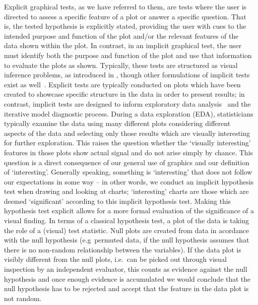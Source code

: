 \documentclass[letterpaper]{ar-1col}\usepackage[]{graphicx}\usepackage[]{color}
\begin{document}

Explicit graphical tests, as we have referred to them, are tests where the user is directed to assess a specific feature of a plot or answer a specific question.
That is, the tested hypothesis is explicitly stated, providing the user with cues to the intended purpose and function of the plot and/or the relevant features of the data shown within the plot.
In contrast, in an implicit graphical test, the user must identify both the purpose and function of the plot and use that information to evaluate the plots as shown.
Typically, these tests are structured as visual inference problems, as introduced in \citet{bujaStatisticalInferenceExploratory2009}, though other formulations of implicit tests exist as well~\citep{hasanhodzicHumansPerceiveTemporal2011}.
Explicit tests are typically conducted on plots which have been created to showcase specific structure in the data in order to present results; in contrast, implicit tests are designed to inform exploratory data analysis~\citep[as advocated by][]{tukeyTechnicalToolsStatistics1965} and the iterative model diagnostic process.
During a data exploration (EDA), statisticians typically examine the data using many different plots considering different aspects of the data and selecting only those results which are visually interesting for further exploration.
This raises the question whether the `visually interesting' features in those plots show actual signal and do not arise simply by chance. This question is a direct consequence of our general use of graphics and our definition of `interesting'. Generally speaking, something is `interesting' that does not follow our expectations in some way -- in other words, we conduct an implicit hypothesis test when drawing and looking at charts; `interesting' charts are those which are deemed `significant' according to this implicit hypothesis test. Making this hypothesis test explicit allows for a more formal evaluation of the significance of a visual finding.
In terms of a classical  hypothesis test,  a plot of the data is taking the role of a (visual) test statistic. Null plots are created from data in acordance with the null hypothesis (e.g\ permuted data, if the null hypothesis assumes that there is no non-random relationship between the variables). If the data plot is visibly different from the null plots, i.e.\ can be picked out through visual inspection by an independent evaluator, this counts as evidence against the null hypothesis and once enough evidence is accumulated we would conclude that the null hypothesis has to be rejected and accept that the feature in the data plot is not random.
\end{document}
